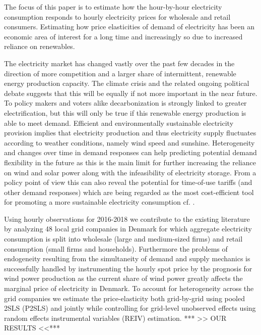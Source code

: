 \label{sec:intro}
The focus of this paper is to estimate how the hour-by-hour electricity consumption responds to hourly electricity prices for wholesale and retail consumers. Estimating how price elasticities of demand of electricity has been an economic area of interest for a long time and increasingly so due to increased reliance on renewables.
\medskip

The electricity market has changed vastly over the past few decades in the direction of more competition and a larger share of intermittent, renewable energy production capacity. The climate crisis and the related ongoing political debate suggests that this will be equally if not more important in the near future. To policy makers and voters alike decarbonization is strongly linked to greater electrification, but this will only be true if this renewable energy production is able to meet demand.  Efficient and environmentally sustainable electricity provision implies that electricity production and thus electricity supply fluctuates according to weather conditions, namely wind speed and sunshine. Heterogeneity and changes over time in demand responses can help predicting potential demand flexibility in the future as this is the main limit for further increasing the reliance on wind and solar power along with the infeasibility of electricity storage. From a policy point of view this can also reveal the potential for time-of-use tariffs (and other demand responses) which are being regarded as the most cost-efficient tool for promoting a more sustainable electricity consumption cf. \citet{albadi2008summary}.
\medskip

Using hourly observations for 2016-2018 we contribute to the existing literature by analyzing 48 local grid companies in Denmark for which aggregate electricity consumption is split into wholesale (large and medium-sized firms) and retail consumption (small firms and households). Furthermore the problems of endogeneity resulting from the simultaneity of demand and supply mechanics is successfully handled by instrumenting the hourly spot price by the prognosis for wind power production as the current share of wind power greatly affects the marginal price of electricity in Denmark. To account for heterogeneity across the grid companies we estimate the price-elasticity both grid-by-grid using pooled 2SLS (P2SLS) and jointly while controlling for grid-level unobserved effects using random effects instrumental variables (REIV) estimation.  *** >> OUR RESULTS <<***
\medskip

